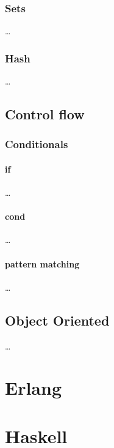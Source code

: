 \documentclass[a4paper,landscape,10pt]{article}
\begin{document}
\begin{multicols*}{2}
  \subsubsection{Sets}

  \dots

  \subsubsection{Hash}

  \dots

  \subsection{Control flow}

  \subsubsection{Conditionals}

  \paragraph{if}

  \dots

  \paragraph{cond}

  \dots

  \paragraph{pattern matching}

  \dots

  \subsection{Object Oriented}

  \dots

\end{multicols*}

\clearpage

\section{Erlang}

\clearpage

\section{Haskell}
\end{document}
